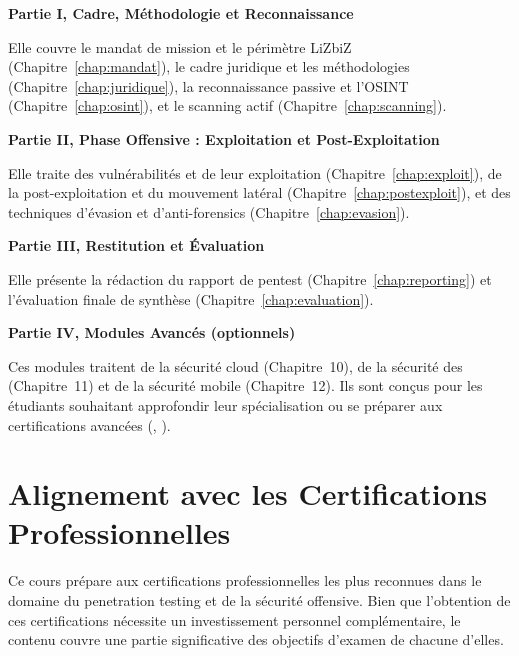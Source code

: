 \medskip
\noindent\textbf{Partie I, Cadre, Méthodologie et Reconnaissance}

Elle couvre le mandat de mission et le périmètre LiZbiZ
(Chapitre~\ref{chap:mandat}), le cadre juridique et les méthodologies
(Chapitre~\ref{chap:juridique}), la reconnaissance passive et l'OSINT
(Chapitre~\ref{chap:osint}), et le scanning actif
(Chapitre~\ref{chap:scanning}).

\medskip
\noindent\textbf{Partie II, Phase Offensive : Exploitation et Post-Exploitation}

Elle traite des vulnérabilités et de leur exploitation
(Chapitre~\ref{chap:exploit}), de la post-exploitation et du mouvement latéral
(Chapitre~\ref{chap:postexploit}), et des techniques d'évasion et d'anti-forensics
(Chapitre~\ref{chap:evasion}).

\medskip
\noindent\textbf{Partie III, Restitution et Évaluation}

Elle présente la rédaction du rapport de pentest
(Chapitre~\ref{chap:reporting}) et l'évaluation finale de synthèse
(Chapitre~\ref{chap:evaluation}).

\medskip
\noindent\textbf{Partie IV, Modules Avancés (optionnels)}

Ces modules traitent de la sécurité cloud (Chapitre~10), de la sécurité des
 (Chapitre~11) et de la sécurité mobile (Chapitre~12). Ils sont
conçus pour les étudiants souhaitant approfondir leur spécialisation ou se
préparer aux certifications avancées (, ).

\section*{Alignement avec les Certifications Professionnelles}

Ce cours prépare aux certifications professionnelles les plus reconnues dans le
domaine du penetration testing et de la sécurité offensive. Bien que l'obtention
de ces certifications nécessite un investissement personnel complémentaire, le
contenu couvre une partie significative des objectifs d'examen de chacune d'elles.

